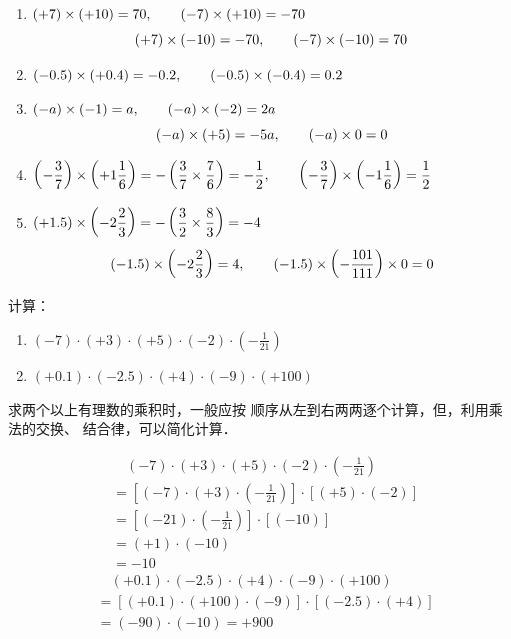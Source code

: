\begin{solution}
	\begin{enumerate}
		\item $(+7)\times (+10)=70,\qquad (-7)\times (+10)=-70$ 
		\[(+7)\times (-10)=-70,\qquad (-7)\times (-10)=70\]
		\item $(-0.5)\times (+0.4)=-0.2,\qquad (-0.5)\times (-0.4)=0.2$
		\item $(-a)\times (-1)=a,\qquad (-a)\times (-2)=2a$  $$(-a)\times (+5)=-5a,\qquad (-a)\times 0=0$$
		\item $\left(-\dfrac{3}{7}\right)\times \left(+1\dfrac{1}{6}\right)=-\left(\dfrac{3}{7}\times\dfrac{7}{6}\right)=-\dfrac{1}{2},\qquad \left(-\dfrac{3}{7}\right)\times \left(-1\dfrac{1}{6}\right)=\dfrac{1}{2} $
		\item  $(+1.5)\times \left(-2\dfrac{2}{3}\right)=-\left(\dfrac{3}{2}\times\dfrac{8}{3}\right)=-4$
		\[(-1.5)\times \left(-2\dfrac{2}{3}\right)=4,\qquad (-1.5)\times \left(-\dfrac{101}{111}\right)\times 0=0 \]
	\end{enumerate}
	
\end{solution}  

\begin{example}
	计算：
	\begin{enumerate}
		\item $(-7) \cdot(+3) \cdot(+5) \cdot(-2) \cdot\left(-\frac{1}{21}\right)$
		\item 
		$(+0.1) \cdot(-2.5) \cdot(+4) \cdot(-9) \cdot(+100)$
	\end{enumerate}
\end{example}

\begin{analyze}
	求两个以上有理数的乘积时，一般应按
	顺序从左到右两两逐个计算，但，利用乘法的交换、
	结合律，可以简化计算．
\end{analyze}

\begin{solution}
	\begin{align*}
	&\quad   (-7) \cdot(+3) \cdot(+5) \cdot(-2) \cdot\left(-\frac{1}{21}\right)\\
	&=\left[(-7)\cdot (+3)\cdot \left(-\frac{1}{21}\right)\right]\cdot [(+5)\cdot (-2)]\tag{交换、结合律}\\
	&=\left[(-21)\cdot \left(-\frac{1}{21}\right)\right]\cdot [(-10)] \tag{异号相乘法则}\\
	&=(+1)\cdot (-10) \tag{同号相乘法则}\\
	&=-10 \tag{1的特性}
	\end{align*} 
	\begin{align*}
	&\quad (+0.1) \cdot(-2.5) \cdot(+4) \cdot(-9) \cdot(+100)\\
	&=[(+0.1)\cdot (+100)\cdot(-9)]\cdot[(-2.5)\cdot (+4)]\\
	&=(-90)\cdot (-10)=+900
	\end{align*}    
\end{solution}

